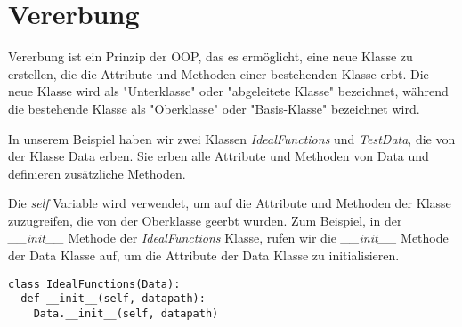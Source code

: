 \section{Vererbung}
Vererbung ist ein Prinzip der OOP, das es ermöglicht, eine neue Klasse zu erstellen, die die Attribute und Methoden einer bestehenden Klasse erbt. Die neue Klasse wird als "Unterklasse" oder "abgeleitete Klasse" bezeichnet, während die bestehende Klasse als "Oberklasse" oder "Basis-Klasse" bezeichnet wird.

In unserem Beispiel haben wir zwei Klassen \textit{IdealFunctions} und \textit{TestData}, die von der Klasse Data erben. Sie erben alle Attribute und Methoden von Data und definieren zusätzliche Methoden.

Die \textit{self} Variable wird verwendet, um auf die Attribute und Methoden der Klasse zuzugreifen, die von der Oberklasse geerbt wurden. Zum Beispiel, in der \textit{\_\_init\_\_} Methode der \textit{IdealFunctions} Klasse, rufen wir die \textit{\_\_init\_\_} Methode der Data Klasse auf, um die Attribute der Data Klasse zu initialisieren.

\begin{lstlisting}[caption={class Data}, label={lst:class IdealFcns}]
class IdealFunctions(Data):
  def __init__(self, datapath):
    Data.__init__(self, datapath)
\end{lstlisting}